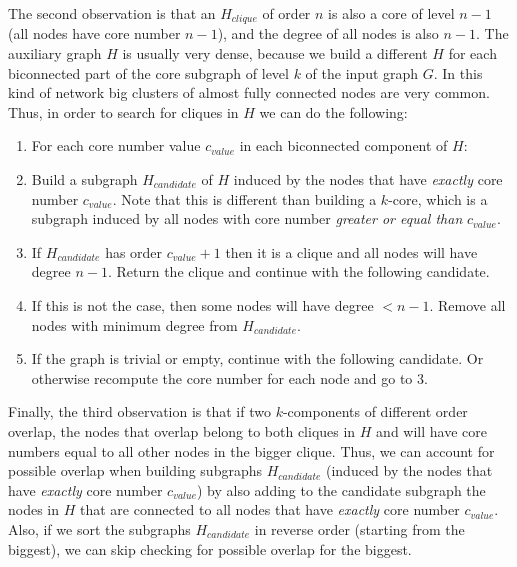 The second observation is that an $H_{clique}$ of order $n$ is also a core of level $n-1$ (all nodes have core number $n-1$), and the degree of all nodes is also $n-1$. The auxiliary graph $H$ is usually very dense, because we build a different $H$ for each biconnected part of the core subgraph of level $k$ of the input graph $G$. In this kind of network big clusters of almost fully connected nodes are very common. Thus, in order to search for cliques in $H$ we can do the following:

\begin{enumerate}

\item For each core number value $c_{value}$ in each biconnected component of $H$:

\item Build a subgraph $H_{candidate}$ of $H$ induced by the nodes that have \emph{exactly} core number $c_{value}$. Note that this is different than building a $k$-core, which is a subgraph induced by all nodes with core number \emph{greater or equal than} $c_{value}$.

\item If $H_{candidate}$ has order $c_{value} + 1$ then it is a clique and all nodes will have degree $n - 1$. Return the clique and continue with the following candidate.

\item If this is not the case, then some nodes will have degree $< n - 1$. Remove all nodes with minimum degree from $H_{candidate}$.

\item If the graph is trivial or empty, continue with the following candidate. Or otherwise recompute the core number for each node and go to 3.

\end{enumerate}

Finally, the third observation is that if two $k$-components of different order overlap, the nodes that overlap belong to both cliques in $H$ and will have core numbers equal to all other nodes in the bigger clique. Thus, we can account for possible overlap when building subgraphs $H_{candidate}$ (induced by the nodes that have \emph{exactly} core number $c_{value}$) by also adding to the candidate subgraph the nodes in $H$ that are connected to all nodes that have \emph{exactly} core number $c_{value}$. Also, if we sort the subgraphs $H_{candidate}$ in reverse order (starting from the biggest), we can skip checking for possible overlap for the biggest.

